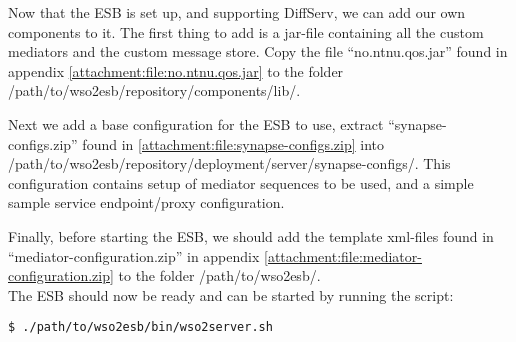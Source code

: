 	Now that the ESB is set up, and supporting DiffServ, we can add our own components to it. The first thing to add is a jar-file containing all the custom mediators and the custom message store. Copy the file “no.ntnu.qos.jar” found in appendix \ref{attachment:file:no.ntnu.qos.jar} to the folder /path/to/wso2esb/repository/components/lib/.
	
	Next we add a base configuration for the ESB to use, extract “synapse-configs.zip” found in \ref{attachment:file:synapse-configs.zip} into /path/to/wso2esb/repository/deployment/server/synapse-configs/. This configuration contains setup of mediator sequences to be used, and a simple sample service endpoint/proxy configuration.
	
	Finally, before starting the ESB, we should add the template xml-files found in “mediator-configuration.zip” in appendix \ref{attachment:file:mediator-configuration.zip} to the folder /path/to/wso2esb/.\\

	The ESB should now be ready and can be started by running the script:\\
\begin{lstlisting}[frame=single, label=run esb server, breaklines=true]
$ ./path/to/wso2esb/bin/wso2server.sh
\end{lstlisting}
